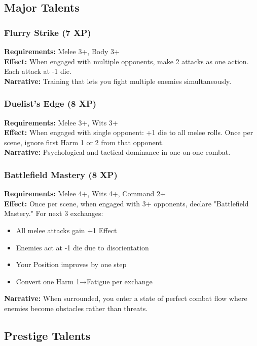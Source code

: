\subsection{Major Talents}

\subsubsection{Flurry Strike (7 XP)}
\textbf{Requirements:} Melee 3+, Body 3+ \\
\textbf{Effect:} When engaged with multiple opponents, make 2 attacks as one action. Each attack at -1 die. \\
\textbf{Narrative:} Training that lets you fight multiple enemies simultaneously.

\subsubsection{Duelist's Edge (8 XP)}
\textbf{Requirements:} Melee 3+, Wits 3+ \\
\textbf{Effect:} When engaged with single opponent: +1 die to all melee rolls. Once per scene, ignore first Harm 1 or 2 from that opponent. \\
\textbf{Narrative:} Psychological and tactical dominance in one-on-one combat.

\subsubsection{Battlefield Mastery (8 XP)}
\textbf{Requirements:} Melee 4+, Wits 4+, Command 2+ \\
\textbf{Effect:} Once per scene, when engaged with 3+ opponents, declare "Battlefield Mastery." For next 3 exchanges:
\begin{itemize}
    \item All melee attacks gain +1 Effect
    \item Enemies act at -1 die due to disorientation
    \item Your Position improves by one step
    \item Convert one Harm 1→Fatigue per exchange
\end{itemize}
\textbf{Narrative:} When surrounded, you enter a state of perfect combat flow where enemies become obstacles rather than threats.


\subsection{Prestige Talents}

